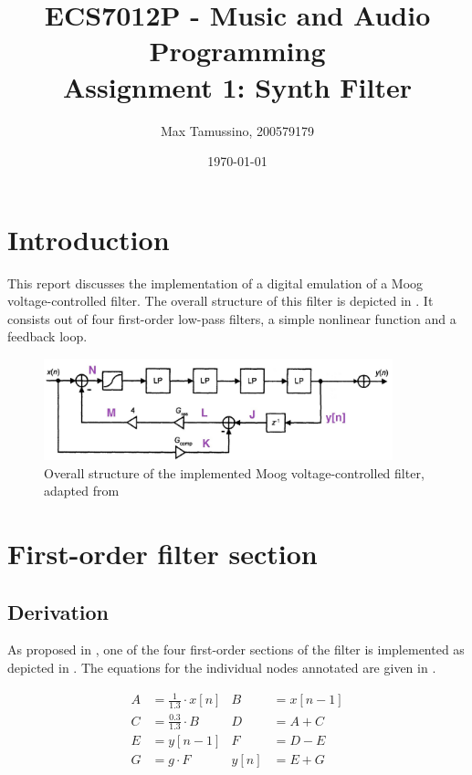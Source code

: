 \documentclass[a4paper, 12pt]{article}
\title{ECS7012P - Music and Audio Programming\\
	   Assignment 1: Synth Filter}
\author{
  Max Tamussino, 200579179
}
\date{\today}
\begin{document}
\maketitle
\tableofcontents
\pagebreak

\section{Introduction} \label{sec:intro}
This report discusses the implementation of a digital emulation \cite{Stilson1996} of a Moog voltage-controlled filter. The overall structure of this filter is depicted in . It consists out of four first-order low-pass filters, a simple nonlinear function and a feedback loop.

\begin{figure}
	\centering
	\includegraphics[width=0.9\textwidth]{feedback.jpg}
	\caption{Overall structure of the implemented Moog voltage-controlled filter, adapted from \cite{Vaelimaeki2006}}
	\label{fig:overall-structure}
\end{figure}

\section{First-order filter section} \label{sec:first-order-fs}
\subsection{Derivation}
As proposed in \cite{Vaelimaeki2006}, one of the four first-order sections of the filter is implemented as depicted in . The equations for the individual nodes annotated are given in . 

\begin{align}
	\label{eq:nodes1}
	A &= \frac{1}{1.3} \cdot x[n] & B &= x[n-1] \\
	\label{eq:nodes2}
	C &= \frac{0.3}{1.3} \cdot B & D &= A + C \\
	\label{eq:nodes3}
	E &= y[n-1] & F &= D - E \\
	\label{eq:nodes4}
	G &= g \cdot F & y[n] &= E + G
\end{align}
\end{document}
